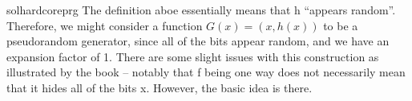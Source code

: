 \begin{questions}
    \begin{mysolution}{solhardcoreprg}
      The definition aboe essentially means that h ``appears random''. Therefore, we might consider a function $G(x) = (x , h(x))$ to be a pseudorandom generator, since all of the bits appear random, and we have an expansion factor of 1. There are some slight issues with this construction as illustrated by the book -- notably that f being one way does not necessarily mean that it hides all of the bits x. However, the basic idea is there.
    \end{mysolution}


\end{questions}



